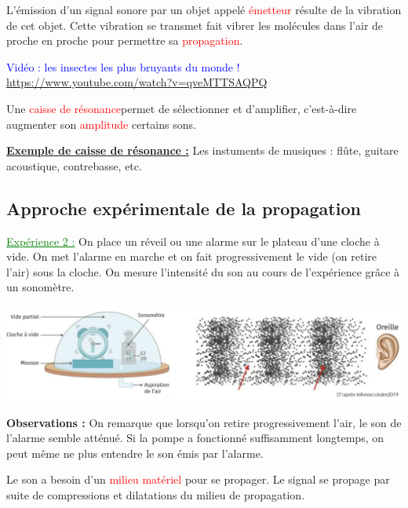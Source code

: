 \begin{tcolorbox}[colback=red!5!white,colframe=red!75!black,title=\textbf{Propriété de l'émission d'un son : }]
L'émission d'un signal sonore par un objet appelé \textcolor{red}{émetteur} résulte de la vibration de cet objet. Cette vibration se transmet fait vibrer les molécules dans l'air de proche en proche pour permettre sa \textcolor{red}{propagation}.
\end{tcolorbox}

\textcolor{blue}{Vidéo : les insectes les plus bruyants du monde !} \url{https://www.youtube.com/watch?v=qveMTTSAQPQ}
\begin{tcolorbox}[colback=red!5!white,colframe=red!75!black,title=\textbf{Caisse de résonance : }]
Une \textcolor{red}{caisse de résonance}permet de sélectionner et d'amplifier, c'est-à-dire augmenter son \textcolor{red}{amplitude} certains sons.
\end{tcolorbox}

\textbf{\underline{Exemple de caisse de résonance :}} Les instuments de musiques : flûte, guitare acoustique, contrebasse, etc.


\subsection{Approche expérimentale de la propagation}
\textcolor{green}{\underline{Expérience 2 :}} On place un réveil ou une alarme sur le plateau d'une cloche à vide. On met l'alarme en marche et on fait progressivement le vide (on retire l'air) sous la cloche. On mesure l'intensité du son au cours de l'expérience grâce à un sonomètre.
\begin{center}
    \includegraphics[scale=0.57]{Images/Propagation_exp.png}
\end{center}

\textbf{Observations :} On remarque que lorsqu'on retire progressivement l'air, le son de l'alarme semble atténué. Si la pompe a fonctionné suffisamment longtemps, on peut même ne plus entendre le son émis par l'alarme.

\begin{tcolorbox}[colback=red!5!white,colframe=red!75!black,title=\textbf{Propriété de la propagation du son : }]
Le son a besoin d'un \textcolor{red}{milieu matériel} pour se propager. Le signal se propage par suite de compressions et dilatations du milieu de propagation.
\end{tcolorbox}

